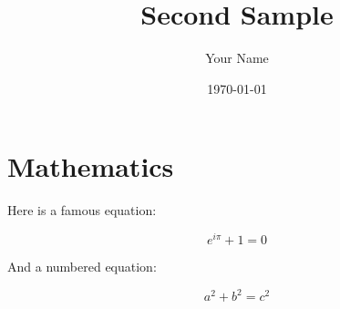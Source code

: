 \documentclass{article}
\title{Second Sample}
\author{Your Name}
\date{\today}
\begin{document}
\maketitle

\section{Mathematics}

Here is a famous equation:

\[
e^{i\pi} + 1 = 0
\]

And a numbered equation:

\begin{equation}
a^2 + b^2 = c^2
\end{equation}
\end{document}
